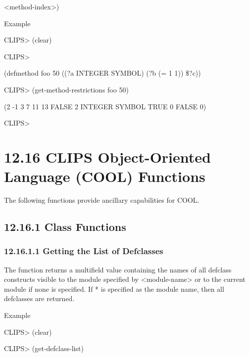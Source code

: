 \documentclass[letterpaper,10pt,english]{sphinxmanual}
\begin{document}
\textless{}method-index\textgreater{})

Example

CLIPS\textgreater{} (clear)

CLIPS\textgreater{}

(defmethod foo 50 ((?a INTEGER SYMBOL) (?b (= 1 1)) \$?c))

CLIPS\textgreater{} (get-method-restrictions foo 50)

(2 -1 3 7 11 13 FALSE 2 INTEGER SYMBOL TRUE 0 FALSE 0)

CLIPS\textgreater{}


\section{12.16 CLIPS Object-Oriented Language (COOL) Functions}
\label{\detokenize{actions:clips-object-oriented-language-cool-functions}}
The following functions provide ancillary capabilities for COOL.


\subsection{12.16.1 Class Functions}
\label{\detokenize{actions:class-functions}}

\subsubsection{12.16.1.1 Getting the List of Defclasses}
\label{\detokenize{actions:getting-the-list-of-defclasses}}
The function  returns a multifield value containing
the names of all defclass constructs visible to the module specified by
\textless{}module-name\textgreater{} or to the current module if none is specified. If * is
specified as the module name, then all defclasses are returned.


\begin{sphinxVerbatim}[commandchars=\\\{\}]
 \PYG{p}{[}\PYG{p}{]}
\end{sphinxVerbatim}

Example

CLIPS\textgreater{} (clear)

CLIPS\textgreater{} (get-defclass-list)
\end{document}
